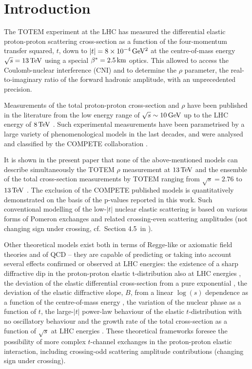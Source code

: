 \section{Introduction}
\label{sec:introduction}

The TOTEM experiment at the LHC has measured the differential elastic proton-proton scattering cross-section as a function of the four-momentum transfer squared, $t$, down to $|t| = 8\times10^{-4}\,{\rm GeV^2}$ at the centre-of-mass energy $\sqrt s = 13\,{\rm TeV}$ using a special $\beta^* = 2.5\,{\rm km}$ optics. This allowed to access the Coulomb-nuclear interference (CNI) and to determine the $\rho$ parameter, the real-to-imaginary ratio of the forward hadronic amplitude, with an unprecedented precision.

Measurements of the total proton-proton cross-section and $\rho$ have been published in the literature from the low energy range of $\sqrt s \sim 10\,{\rm GeV}$ up to the LHC energy of $8\,{\rm TeV}$ \cite{pdg-2016}. Such experimental measurements have been parametrised by a large variety of phenomenological models in the last decades, and were analysed and classified by the COMPETE collaboration \cite{compete}.

It is shown in the present paper that none of the above-mentioned models can describe simultaneously the TOTEM $\rho$ measurement at $13\,{\rm TeV}$ and the ensemble of the total cross-section measurements by TOTEM ranging from $\sqrt s = 2.76$ to $13\,{\rm TeV}$ \cite{totem-7tev-tot2,totem-8tev-90m,totem-8tev-1km,totem-13tev-90m}. The exclusion of the COMPETE published models is quantitatively demonstrated on the basis of the p-values reported in this work. Such conventional modelling of the low-$|t|$ nuclear elastic scattering is based on various forms of Pomeron exchanges and related crossing-even scattering amplitudes (not changing sign under crossing, cf.~Section 4.5~in \cite{barone-predazzi}).

Other theoretical models exist both in terms of Regge-like or axiomatic field theories \cite{nicolescu-1992} and of QCD \cite{bartels-1980,kwiecinski-1980,jaroszewicz-1981} -- they are capable of predicting or taking into account several effects confirmed or observed at LHC energies: the existence of a sharp diffractive dip in the proton-proton elastic t-distribution also at LHC energies \cite{totem-7tev-first}, the deviation of the elastic differential cross-section from a pure exponential \cite{totem-8tev-90m}, the deviation of the elastic diffractive slope, $B$, from a linear $\log(s)$ dependence as a function of the centre-of-mass energy \cite{totem-13tev-90m}, the variation of the nuclear phase as a function of $t$, the large-$|t|$ power-law behaviour of the elastic $t$-distribution with no oscillatory behaviour and the growth rate of the total cross-section as a function of $\sqrt s$ at LHC energies \cite{totem-13tev-90m}. These theoretical frameworks foresee the possibility of more complex $t$-channel exchanges in the proton-proton elastic interaction, including crossing-odd scattering amplitude contributions (changing sign under crossing).

